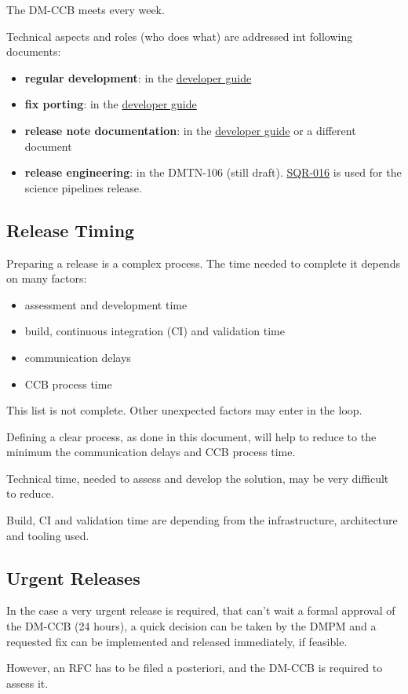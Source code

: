 The DM-CCB meets every week.

Technical aspects and roles (who does what) are addressed int following documents:

\begin{itemize}
\item {\bf regular development}: in the \href{https://developer.lsst.io/}{developer guide}
\item {\bf fix porting}: in the \href{https://developer.lsst.io/}{developer guide}
\item {\bf release note documentation}: in the \href{https://developer.lsst.io/}{developer guide} or a different document
\item {\bf release engineering}: in the DMTN-106 (still draft). \href{https://sqr-016.lsst.io/}{SQR-016} is used for the science pipelines release.
\end{itemize}


\subsection{Release Timing}

Preparing a release is a complex process.
The time needed to complete it depends on many factors:

\begin{itemize}
\item assessment and development time
\item build, continuous integration (\gls{CI}) and validation time
\item communication delays
\item \gls{CCB} process time
\end{itemize}

This list is not complete. Other unexpected factors may enter in the loop.

Defining a clear process, as done in this document, will help to reduce to the minimum the communication delays and \gls{CCB} process time.

Technical time, needed to assess and develop the solution, may be very difficult to reduce.

Build, \gls{CI} and validation time are depending from the infrastructure, architecture and tooling used.


\subsection{Urgent Releases}

In the case a very urgent release is required, that can't wait a formal approval of the DM-CCB (24 hours),
a quick decision can be taken by the \gls{DMPM} and a requested fix can be implemented and released immediately, if feasible.

However, an \gls{RFC} has to be filed a posteriori, and the DM-CCB is required to assess it.

